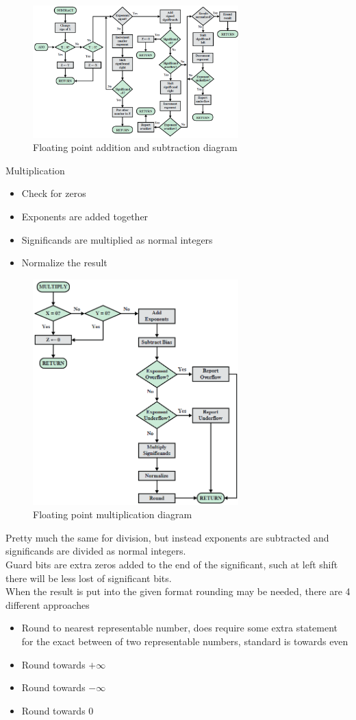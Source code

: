 \documentclass[12pt, a4paper]{article}
\begin{document}
			\begin{figure}[h!]
				\includegraphics[width=300px]{assets/floatingpointAddSub.png}
				\centering
				\caption{Floating point addition and subtraction diagram}
			\end{figure}
			Multiplication
			\begin{itemize}
				\item Check for zeros
				\item Exponents are added together
				\item Significands are multiplied as normal integers
				\item Normalize the result
			\end{itemize}
			\begin{figure}[h!]
				\includegraphics[width=300px]{assets/floatingpointMulti.png}
				\centering
				\caption{Floating point multiplication diagram}
			\end{figure}
			Pretty much the same for division, but instead exponents are subtracted and significands are divided as normal integers.\\
			Guard bits are extra zeros added to the end of the significant, such at left shift there will be less lost of significant bits.\\
			When the result is put into the given format rounding may be needed, there are 4 different approaches
			\begin{itemize}
				\item Round to nearest representable number, does require some extra statement for the exact between of two representable numbers, standard is towards even
				\item Round towards $+\infty$
				\item Round towards $-\infty$
				\item Round towards 0
			\end{itemize}
\end{document}
